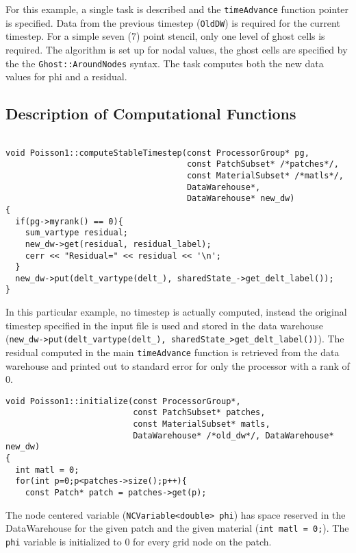 \documentclass[12pt]{report}
\begin{document}
For this example, a single task is described and the
\texttt{timeAdvance} function pointer is specified.  Data from the
previous timestep (\texttt{OldDW}) is required for the current
timestep.  For a simple seven (7) point stencil, only one level of
ghost cells is required.  The algorithm is set up for nodal values,
the ghost cells are specified by the the \texttt{Ghost::AroundNodes}
syntax.  The task computes both the new data values for phi and a
residual.

\subsection{Description of Computational Functions}

\begin{verbatim}

void Poisson1::computeStableTimestep(const ProcessorGroup* pg,
                                     const PatchSubset* /*patches*/,
                                     const MaterialSubset* /*matls*/,
                                     DataWarehouse*,
                                     DataWarehouse* new_dw)
{
  if(pg->myrank() == 0){
    sum_vartype residual;
    new_dw->get(residual, residual_label);
    cerr << "Residual=" << residual << '\n';
  }
  new_dw->put(delt_vartype(delt_), sharedState_->get_delt_label());
}

\end{verbatim}

In this particular example, no timestep is actually computed, instead
the original timestep specified in the input file is used and stored
in the data warehouse (\texttt{new\_dw->put(delt\_vartype(delt\_),
  sharedState\_\->get\_delt\_label())}).  The residual computed in the
main \texttt{timeAdvance} function is retrieved from the data
warehouse and printed out to standard error for only the processor
with a rank of 0.

\begin{verbatim}
void Poisson1::initialize(const ProcessorGroup*,
                          const PatchSubset* patches,
                          const MaterialSubset* matls,
                          DataWarehouse* /*old_dw*/, DataWarehouse* new_dw)
{
  int matl = 0;
  for(int p=0;p<patches->size();p++){
    const Patch* patch = patches->get(p);

\end{verbatim}

The node centered variable (\texttt{NCVariable<double> phi}) has space
reserved in the DataWarehouse for the given patch and the given
material (\texttt{int matl = 0;}).  The \texttt{phi} variable is
initialized to 0 for every grid node on the patch.
\end{document}
